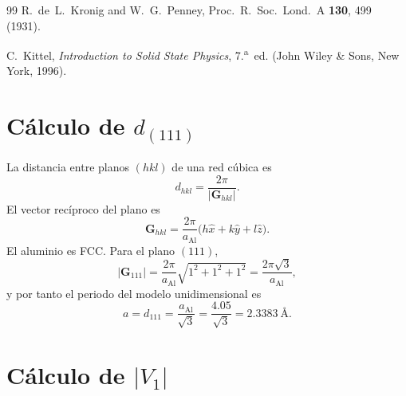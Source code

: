 \documentclass[hidelinks]{article}
\begin{document}
\begin{thebibliography}{99}
R.~de~L.~Kronig and W.~G.~Penney,
Proc.~R.~Soc.~Lond.~A \textbf{130}, 499 (1931).

C.~Kittel, \emph{Introduction to Solid State Physics}, 7.\textsuperscript{a}~ed.
(John Wiley \& Sons, New York, 1996).
\end{thebibliography}

\appendix
\section{Cálculo de $d_{(111)}$}

La distancia entre planos $(hkl)$ de una red cúbica es
\begin{equation}
d_{hkl}=\frac{2\pi}{|\mathbf{G}_{hkl}|}.
\end{equation}
El vector recíproco del plano es
\begin{equation}
\mathbf{G}_{hkl}=\frac{2\pi}{a_{\mathrm{Al}}}\bigl(h\hat{x}+k\hat{y}+l\hat{z}\bigr).
\end{equation}
El aluminio es FCC. Para el plano $(111)$,
\begin{equation}
|\mathbf{G}_{111}|=\frac{2\pi}{a_{\mathrm{Al}}}\sqrt{1^{2}+1^{2}+1^{2}}=\frac{2\pi\sqrt{3}}{a_{\mathrm{Al}}},
\end{equation}
y por tanto el periodo del modelo unidimensional es
\begin{equation}
a=d_{111}=\frac{a_{\mathrm{Al}}}{\sqrt{3}}=\frac{4.05}{\sqrt{3}}=2.3383~\text{\AA}.
\end{equation}

\section{Cálculo de $|V_1|$}
\end{document}
